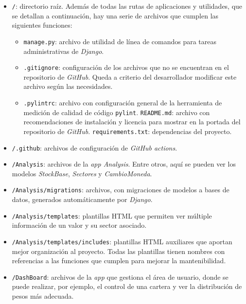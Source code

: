 \begin{itemize}
\tightlist
\item
\texttt{/}: directorio raíz. Además de todas las rutas de aplicaciones y utilidades, que se detallan a continuación, hay una serie de archivos que cumplen las siguientes funciones:
	\begin{itemize}
	\tightlist
	\item
	\texttt{manage.py}: archivo de utilidad de línea de comandos para tareas 
	administrativas de \emph{Django}.
	\item
	\texttt{.gitignore}: configuración de los archivos que no se encuentran en el 
	repositorio de \emph{GitHub}. Queda a criterio del desarrollador modificar este archivo 
	según las necesidades. 
	\item
	\texttt{.pylintrc}: archivo con configuración general de la herramienta de medición de calidad de código \texttt{pylint}.
	\texttt{README.md}: archivo con recomendaciones de instalación y licencia para mostrar en la portada del repositorio de \emph{GitHub}.
	\texttt{requirements.txt}: dependencias del proyecto. 
	\end{itemize}

\item 
\texttt{/.github}: archivos de configuración de \emph{GitHub actions}.

\item 
\texttt{/Analysis}: archivos de la \emph{app Analysis}. Entre otros, aquí se pueden ver los modelos \emph{StockBase}, \emph{Sectores} y \emph{CambioMoneda}.

\item 
\texttt{/Analysis/migrations}: archivos, con migraciones de modelos a bases de datos, generados automáticamente por \emph{Django}.

\item 
\texttt{/Analysis/templates}: plantillas HTML que permiten ver múltiple información de un valor y su sector asociado.  

\item 
\texttt{/Analysis/templates/includes}: plantillas HTML auxiliares que aportan mejor organización al proyecto. Todas las plantillas tienen nombres con referencias a las funciones que cumplen para mejorar la mantenibilidad.

\item 
\texttt{/DashBoard}: archivos de la \emph{app} que gestiona el área de usuario, donde se puede realizar, por ejemplo, el control de una cartera y ver la distribución de pesos más adecuada. 


\end{itemize}
